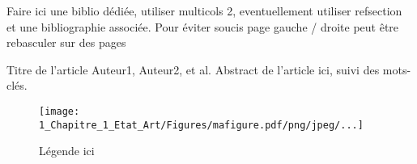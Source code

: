 Faire ici une biblio dédiée, utiliser multicols 2, eventuellement utiliser refsection et une bibliographie associée.
Pour éviter soucis page gauche / droite peut être rebasculer sur des pages

\begin{includedarticle}
  {Titre de l'article}
  {Auteur1, Auteur2, et al.}
  {Abstract de l'article ici, suivi des mots-clés.}
  
\begin{figure}[htbp]
\centering
\texttt{[image: 1\_Chapitre\_1\_Etat\_Art/Figures/mafigure.pdf/png/jpeg/...]}
\caption{Légende ici}
\end{figure}
  


\end{includedarticle}